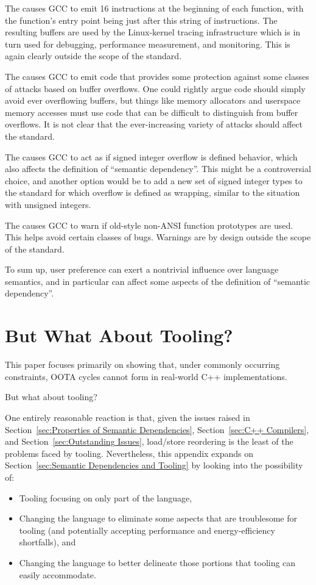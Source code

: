\documentclass[10]{article}
\begin{document}
The  causes GCC to emit 16
 instructions at the beginning of each function, with
the function's entry point being just after this string of 
instructions.
The resulting buffers are used by the Linux-kernel tracing infrastructure
which is in turn used for debugging, performance measurement, and
monitoring.
This is again clearly outside the scope of the standard.

The  causes GCC to emit code that provides
some protection against some classes of attacks based on buffer overflows.
One could rightly argue code should simply avoid ever overflowing buffers,
but things like memory allocators and userspace memory accesses must
use code that can be difficult to distinguish from buffer overflows.
It is not clear that the ever-increasing variety of attacks should
affect the standard.

The  causes GCC to act as if signed integer
overflow is defined behavior,
which also affects the definition of ``semantic dependency''.
This might be a controversial choice, and another option would be to add
a new set of signed integer types to the standard for which overflow is
defined as wrapping, similar to the situation with unsigned integers.

The  causes GCC to warn if old-style
non-ANSI function prototypes are used.
This helps avoid certain classes of bugs.
Warnings are by design outside the scope of the standard.

To sum up, user preference can exert a nontrivial influence over
language semantics, and in particular can affect some aspects of the
definition of ``semantic dependency''.

\clearpage

\section{But What About Tooling?}
\label{sec:But What About Tooling?}

This paper focuses primarily on showing that, under commonly occurring
constraints, OOTA cycles cannot form in real-world C++ implementations.

But what about tooling?

One entirely reasonable reaction is that, given the issues raised in
Section~\ref{sec:Properties of Semantic Dependencies},
Section~\ref{sec:C++ Compilers},
and
Section~\ref{sec:Outstanding Issues},
load/store reordering is the least of the problems faced by tooling.
Nevertheless, this appendix expands on
Section~\ref{sec:Semantic Dependencies and Tooling}
by looking into the possibility of:
\begin{itemize}
\item	Tooling focusing on only part of the language,
\item	Changing the language to eliminate some aspects that are
	troublesome for tooling (and potentially accepting performance
	and energy-efficiency shortfalls), and
\item	Changing the language to better delineate those portions that
	tooling can easily accommodate.
\end{itemize}
\end{document}
